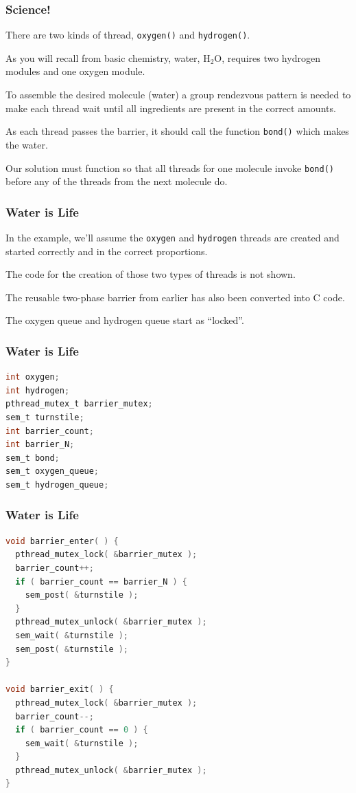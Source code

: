\begin{frame}
	\frametitle{Science!}

	There are two kinds of thread, \texttt{oxygen()} and \texttt{hydrogen()}.

	As you will recall from basic chemistry, water, H$_{2}$O, requires two hydrogen modules and one oxygen module.

	To assemble the desired molecule (water) a group rendezvous pattern is needed to make each thread wait until all ingredients are present in the correct amounts.

	As each thread passes the barrier, it should call the function \texttt{bond()} which makes the water.

	Our solution must function so that all threads for one molecule invoke \texttt{bond()} before any of the threads from the next molecule do.

\end{frame}


\begin{frame}
	\frametitle{Water is Life}

	In the example, we'll assume the \texttt{oxygen} and \texttt{hydrogen} threads are created and started correctly and in the correct proportions.

	The code for the creation of those two types of threads is not shown.

	The reusable two-phase barrier from earlier has also been converted into C code.

	The oxygen queue and hydrogen queue start as ``locked''.

\end{frame}

\begin{frame}[fragile]
	\frametitle{Water is Life}

	\begin{lstlisting}[language=C]
int oxygen;
int hydrogen;
pthread_mutex_t barrier_mutex;
sem_t turnstile;
int barrier_count;
int barrier_N;
sem_t bond;
sem_t oxygen_queue;
sem_t hydrogen_queue;
\end{lstlisting}
\end{frame}

\begin{frame}[fragile]
	\frametitle{Water is Life}

	\begin{lstlisting}[language=C]
void barrier_enter( ) {
  pthread_mutex_lock( &barrier_mutex );
  barrier_count++;
  if ( barrier_count == barrier_N ) {
    sem_post( &turnstile );
  }
  pthread_mutex_unlock( &barrier_mutex );
  sem_wait( &turnstile );
  sem_post( &turnstile );            
}

void barrier_exit( ) {
  pthread_mutex_lock( &barrier_mutex );
  barrier_count--;
  if ( barrier_count == 0 ) {
    sem_wait( &turnstile );
  }
  pthread_mutex_unlock( &barrier_mutex );
}
\end{lstlisting}

\end{frame}

